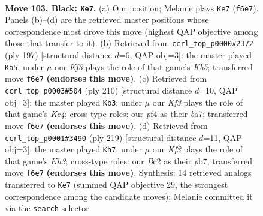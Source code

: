 \documentclass[11pt]{article}
\begin{document}
\clearpage

\begin{figure}[p]\centering
\begin{subfigure}{0.46\textwidth}\centering
\resizebox{\linewidth}{!}{%
\newchessgame
\chessboard[
  setfen={6K1/8/5k2/5p2/5P2/8/2b5/8 b - - 21 103},
  showmover=false,
  pgfstyle=straightmove, color=movearrow, markmove={f6-e7}
]}
\caption{}
\end{subfigure}\hfill
\begin{subfigure}{0.46\textwidth}\centering
\resizebox{\linewidth}{!}{%
\newchessgame
\chessboard[
  setfen={7b/8/8/8/1k6/p2K1N2/P7/8 b - - 55 99},
  showmover=false,
  pgfstyle=straightmove, color=movearrow, markmove={b4-a5}
]}
\caption{}
\end{subfigure}
\\[4pt]
\begin{subfigure}{0.46\textwidth}\centering
\resizebox{\linewidth}{!}{%
\newchessgame
\chessboard[
  setfen={8/b3k3/P7/3P4/2K5/5B2/8/8 w - - 23 106},
  showmover=false,
  pgfstyle=straightmove, color=movearrow, markmove={c4-b3}
]}
\caption{}
\end{subfigure}\hfill
\begin{subfigure}{0.46\textwidth}\centering
\resizebox{\linewidth}{!}{%
\newchessgame
\chessboard[
  setfen={1b6/1P6/6pk/8/7P/8/6K1/3B4 b - - 14 110},
  showmover=false,
  pgfstyle=straightmove, color=movearrow, markmove={h6-h7}
]}
\caption{}
\end{subfigure}
\caption{\textbf{Move 103, Black: \texttt{Ke7}.} (a) Our position; Melanie plays \texttt{Ke7} (\texttt{f6e7}). Panels (b)--(d) are the retrieved master positions whose correspondence most drove this move (highest QAP objective among those that transfer to it). (b) Retrieved from \texttt{ccrl\_top\_p0000\#2372} (ply 197) [structural distance $d$=6, QAP obj=3]: the master played \texttt{Ka5}; under $\mu$ our \emph{Kf3} plays the role of that game's \emph{Kb5}; transferred move \texttt{f6e7} \textbf{(endorses this move)}. (c) Retrieved from \texttt{ccrl\_top\_p0003\#504} (ply 210) [structural distance $d$=10, QAP obj=3]: the master played \texttt{Kb3}; under $\mu$ our \emph{Kf3} plays the role of that game's \emph{Kc4}; cross-type roles: our \emph{p}f4 as their \emph{b}a7; transferred move \texttt{f6e7} \textbf{(endorses this move)}. (d) Retrieved from \texttt{ccrl\_top\_p0001\#3490} (ply 219) [structural distance $d$=11, QAP obj=3]: the master played \texttt{Kh7}; under $\mu$ our \emph{Kf3} plays the role of that game's \emph{Kh3}; cross-type roles: our \emph{B}c2 as their \emph{p}b7; transferred move \texttt{f6e7} \textbf{(endorses this move)}. Synthesis: 14 retrieved analogs transferred to \texttt{Ke7} (summed QAP objective 29, the strongest correspondence among the candidate moves); Melanie committed it via the \texttt{search} selector.}
\label{fig:thought-m205}
\end{figure}
\end{document}
